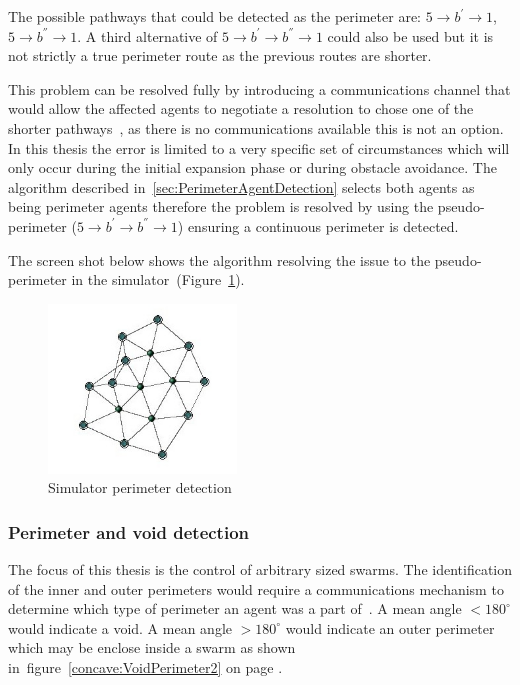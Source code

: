The possible pathways that could be detected as the perimeter are: $5 \rightarrow b^{'} \rightarrow 1$, $5 \rightarrow b^{''} \rightarrow 1$. A third alternative of $5 \rightarrow b^{'} \rightarrow b^{''} \rightarrow 1$ could also be used but it is not strictly a true perimeter route as the previous routes are shorter.  

This problem can be resolved fully by introducing a communications channel that would allow the affected agents to negotiate a resolution to chose one of the shorter pathways~\cite{MD:09}, as there is no communications available this is not an option. In this thesis the error is limited to a very specific set of circumstances which will only occur during the initial expansion phase or during obstacle avoidance. The algorithm described in~\autoref{sec:PerimeterAgentDetection} selects both agents as being perimeter agents therefore the problem is resolved by using the pseudo-perimeter ($5 \rightarrow b^{'} \rightarrow b^{''} \rightarrow 1$) ensuring a continuous perimeter is detected. 

The screen shot below shows the algorithm resolving the issue to the pseudo-perimeter in the simulator~(Figure~\ref{reduced:PerimeterAnomaly}).

\begin{figure}[H]
\begin{center}
\includegraphics[width=5cm]{CHAPTER-6/figures/PerimeterAnomaly}
\end{center}
\caption{Simulator perimeter detection\label{reduced:PerimeterAnomaly}}
\end{figure}

\subsubsection{Perimeter and void detection}\label{sec:PerimeterVoidDetection} 
The focus of this thesis is the control of arbitrary sized swarms. The identification of the inner and outer perimeters would require a communications mechanism to determine which type of perimeter an agent was a part of~\cite{ZAPS:07,MD:09}. A mean angle $< 180^\circ$ would indicate a void. A mean angle $> 180^\circ$ would indicate an outer perimeter which may be enclose inside a swarm as shown in~figure~\ref{concave:VoidPerimeter2} on page \pageref{concave:VoidPerimeter2}.  

